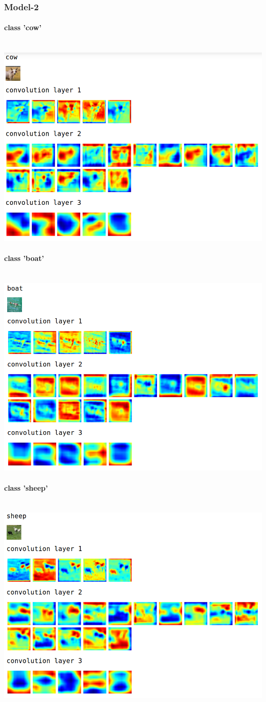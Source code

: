 \documentclass[fleqn]{article}
\newcommand{\myparagraph}[1]{\paragraph{#1}\mbox{}\\}
\begin{document}
\subsubsection{Model-2}
\myparagraph{class 'cow'}
\includegraphics[scale=0.4]{./pics/cow_hidden_layers.png}\\
\myparagraph{class 'boat'}
\includegraphics[scale=0.4]{./pics/boat_hidden_layers.png}\\
\myparagraph{class 'sheep'}
\includegraphics[scale=0.4]{./pics/sheep_hidden_layers.png}\\
\end{document}
